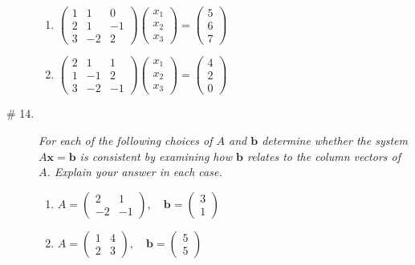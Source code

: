 \documentclass[8pt]{article} %
\begin{document}
\begin{description}
{\begin{enumerate}[label=(\alph*)]
		\item $\begin{pmatrix}1&1&0\\2&1&-1\\3&-2&2\end{pmatrix}\begin{pmatrix}x_1\\x_2\\x_3
			\end{pmatrix}=\begin{pmatrix}5\\6\\7\end{pmatrix}$
		\item $\begin{pmatrix}2&1&1\\1&-1&2\\3&-2&-1\end{pmatrix}\begin{pmatrix}x_1\\x_2\\x_3
			\end{pmatrix}=\begin{pmatrix}4\\2\\0\end{pmatrix}$
	\end{enumerate}
	}
\item[\# 14.]{
	\renewcommand{\b}{\mathbf{b}}
	\newcommand{\x}{\mathbf{x}}
	{\it For each of the following choices of $A$ and $\b$ determine whether the system $A\x=\b$ is consistent by examining how $\b$ relates
	to the column vectors of $A$. Explain your answer in each case.}
	\begin{multicols}{2}\begin{enumerate}[label=(\alph*)]
		\item $A=\begin{pmatrix}2&1\\-2&-1\end{pmatrix},\quad\b=\begin{pmatrix}3\\1\end{pmatrix}$
		\item $A=\begin{pmatrix}1&4\\2&3\end{pmatrix},\quad\b=\begin{pmatrix}5\\5\end{pmatrix}$
	\end{enumerate}\end{multicols}
}
\end{description}
\end{document}
